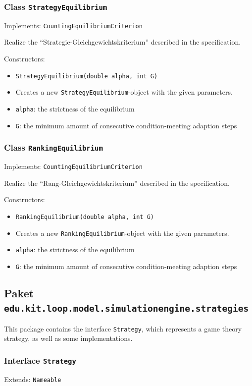 \documentclass[parskip=full,11pt]{scrartcl}
\begin{document}
\subsubsection{Class \texttt{StrategyEquilibrium}}
Implements: \texttt{CountingEquilibriumCriterion}

Realize the \enquote{Strategie-Gleichgewichtskriterium} described in the specification.

Constructors:
\begin{itemize}\itemsep -10pt
\item \texttt{StrategyEquilibrium(double alpha, int G)}
\item[] Creates a new \texttt{StrategyEquilibrium}-object with the given parameters.
\item[] \texttt{alpha}: the strictness of the equilibrium
\item[] \texttt{G}: the minimum amount of consecutive condition-meeting adaption steps
\end{itemize}

\subsubsection{Class \texttt{RankingEquilibrium}}
Implements: \texttt{CountingEquilibriumCriterion}

Realize the \enquote{Rang-Gleichgewichtskriterium} described in the specification.

Constructors:
\begin{itemize}\itemsep -10pt
\item \texttt{RankingEquilibrium(double alpha, int G)}
\item[] Creates a new \texttt{RankingEquilibrium}-object with the given parameters.
\item[] \texttt{alpha}: the strictness of the equilibrium
\item[] \texttt{G}: the minimum amount of consecutive condition-meeting adaption steps
\end{itemize}

\subsection{Paket \texttt{edu.kit.loop.model.simulationengine.strategies}}
This package contains the interface \texttt{Strategy}, which represents a game theory strategy, as well as some implementations.


\subsubsection{Interface \texttt{Strategy}}
Extends: \texttt{Nameable}
\end{document}
